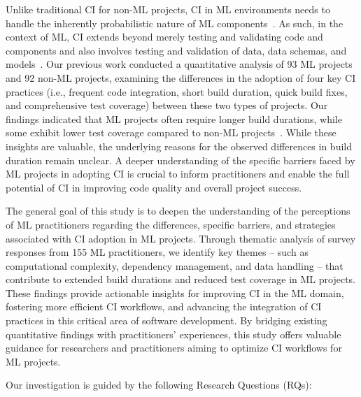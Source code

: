 Unlike traditional CI for non-ML projects, CI in ML environments needs to handle the inherently probabilistic nature of ML components~\citep{renggli2019continuous}.
As such, in the context of ML, CI extends beyond merely testing and validating code and components and also involves testing and validation of data, data schemas, and models~\citep{karamitsos2020applying}. 
Our previous work conducted a quantitative analysis of 93 ML projects and 92 non-ML projects, examining the differences in the adoption of four key CI practices (i.e., frequent code integration, short build duration, quick build fixes, and comprehensive test coverage)  between these two types of projects.
Our findings indicated that ML projects often require longer build durations, while some exhibit lower test coverage compared to non-ML projects~\citep{bernardo2024machine}.
While these insights are valuable, the underlying reasons for the observed differences in build duration remain unclear.
A deeper understanding of the specific barriers faced by ML projects in adopting CI is crucial to inform practitioners and enable the full potential of CI in improving code quality and overall project success.

The general goal of this study is to deepen the understanding of the perceptions of ML practitioners regarding the differences, specific barriers, and strategies associated with CI adoption in ML projects.
Through thematic analysis of survey responses from 155 ML practitioners, we identify key themes -- such as computational complexity, dependency management, and data handling -- that contribute to extended build durations and reduced test coverage in ML projects.
These findings provide actionable insights for improving CI in the ML domain, fostering more efficient CI workflows, and advancing the integration of CI practices in this critical area of software development.
By bridging existing quantitative findings with practitioners' experiences, this study offers valuable guidance for researchers and practitioners aiming to optimize CI workflows for ML projects.

Our investigation is guided by the following Research Questions (RQs):

